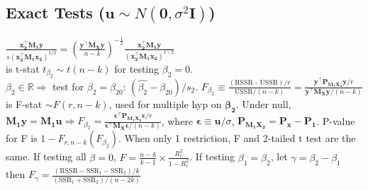 \subsection*{Exact Tests ($\mathbf{u} \sim N(\mathbf{0}, \sigma^2 \mathbf{I})$)}
$\frac{\mathbf{x_2^{\top} M_1 y}}{s(\mathbf{x_2 ^{\top} M_1 x_2})^{1 / 2}} = \left( \frac{\mathbf{y^{\top}M_X y }}{n-k} \right)^{-\frac{1}{2}} \frac{\mathbf{x_2^{\top} M_1 y}}{(\mathbf{x_2 ^{\top} M_1 x_2})^{1 \backslash 2}}$\\
is t-stat $t_{\beta_2} \sim t(n-k)$ for testing $\beta_2 = 0$.\\
$\beta_2 \in \mathbb{R} \Rightarrow$ test for $\beta_2 = \beta_{20}$: $(\hat{\beta_2} - \beta_{20}) / s_2$.
$F_{\beta_2} \equiv \frac{(\text{RSSR - USSR}) / r}{\text{USSR} / (n-k) } = \frac{\mathbf{y^{\top}P_{M_1 X_2} y}/r}{\mathbf{y^{\top}M_X y}/(n-k)}$ is F-stat $\sim F(r,n-k)$, used for multiple hyp on $\mathbf{\beta_2}$.
Under null, $\mathbf{M_1 y = M_1 u} \Rightarrow F_{\beta_2} = \frac{\mathbf{\epsilon^{\top}P_{M_1 X_2} \epsilon /}r }{\mathbf{\epsilon^{\top}M_X \epsilon}/(n-k)}$, where $\mathbf{\epsilon \equiv u} / \sigma$, $\mathbf{P_{M_1 X_2} = P_x - P_1}$.
P-value for F is $1-F_{r,n-k}(F_{\beta_2})$.
When only 1 restriction, F and 2-tailed t test are the same.
If testing all $\beta = 0$, $F = \frac{n-k}{k-1} \times \frac{R_c ^2}{1-R_c ^2}$.
If testing $\beta_1 = \beta_2$, let $\gamma = \beta_2 - \beta_1$ then $F_{\gamma} = \frac{(\text{RSSR} - \text{SSR}_1 - \text{SSR}_2) / k}{(\text{SSR}_1 + \text{SSR}_2) / (n-2k)}$
